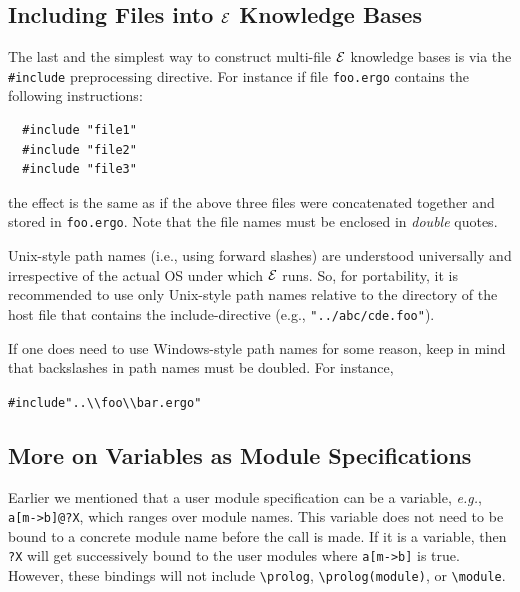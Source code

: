 \documentclass[11pt]{article}
\newcommand{\ERGO}{\mbox{\ensuremath{\cal{E}}\smaller{{\sc{RGO}}}}\xspace}
\newcommand{\FLSYSTEM}{\ERGO}
\newcommand{\ergoext}{ergo\xspace}
\newcommand{\bs}{\textbackslash}
\begin{document}
\subsection{Including Files into \FLSYSTEM Knowledge Bases}

The last and the simplest way to construct multi-file \FLSYSTEM 
knowledge bases is via the {\tt \#include} preprocessing directive.
For instance if file {\tt foo.\ergoext} contains the following instructions:
\begin{verbatim}
  #include "file1" 
  #include "file2"
  #include "file3"
\end{verbatim}
the effect is the same as if the above three files were concatenated
together and stored in {\tt foo.\ergoext}. Note that the file names must be
enclosed in \emph{double} quotes.

Unix-style path names (i.e., using forward slashes)
are understood universally and irrespective of the
actual OS under which \FLSYSTEM runs. So, for portability, it is
recommended to use only Unix-style path names relative to the directory of
the host file that contains the include-directive (e.g.,
\texttt{"../abc/cde.foo"}). 

If one does need to use Windows-style path names for some reason, keep in
mind that backslashes in path names must be doubled. For instance, 
\begin{alltt}
  #include "..\bs{}\bs{}foo\bs{}\bs{}bar.\ergoext"  
\end{alltt}

\subsection{More on Variables as Module Specifications}

Earlier we mentioned that a user module specification can be a variable,
{\it e.g.}, {\tt a[m->b]@?X}, which ranges over module names. This variable
does not need to be bound to a concrete module name before the call is
made.  If it is a variable, then {\tt ?X} will get successively bound to the
user modules where {\tt a[m->b]} is true.  However, these bindings will not
include {\tt \bs{}prolog}, {\tt \bs{}prolog(module)}, or {\tt \bs{}module}.
\end{document}
